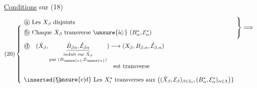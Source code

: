 \uline{Conditions} sur (18)

\[
\begin{array}{@{}r@{\;}l@{\;}l@{}}
&\text{\textcircled{a} Les }X_\beta\text{ disjoints}
&\smash{\raisebox{-0.30cm}{$\left.\vphantom{\rule[-0.50cm]{0pt}{1.00cm}}\right\}\Longrightarrow$}}\\[0.45em]
\smash{\raisebox{-1.25cm}{$(20)\left\{\vphantom{\rule[-1.60cm]{0pt}{3.20cm}}\right.$}}
&\text{\textcircled{b} Chaque }\dot X_\beta\text{ transverse \unsure{à|:} }(B_\alpha^*,\mathcal E_\alpha^*)
&\\[1em]
&\text{\textcircled{d}}\quad
(\dot X_\beta,
\underset{\substack{\text{induit sur }\dot X_\beta\\
\text{par }(B_{\unsure{\alpha}},\mathcal E_{\unsure{\alpha}})}}
{\underline{\dot B_{\beta\alpha},\dot{\mathcal E}_{\beta\alpha}}})
\longrightarrow
(X_\beta,B_{\beta,\alpha},\dot{\mathcal E}_{\beta,\alpha})
&\\
&\hspace{5.2cm}\text{est transverse}&\\[1em]
&\inserted{\text{\textcircled{\unsure{c|d}} Les }X_i^*\text{ transverses aux }
\big((\dot X_\beta,\mathcal E_\beta)_{\beta\in I_0},
(B_\alpha^*,\mathcal E_\alpha^*)_{\alpha\in\Lambda}\big)}&
\end{array}
\]
